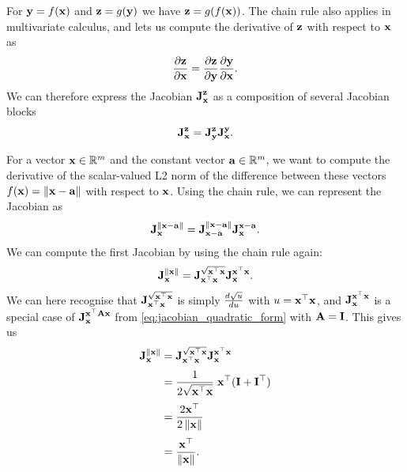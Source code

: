 For $\vecy = f(\vecx)$ and $\vecz = g(\vecy)$ we have $\vecz = g(f(\vecx))$.
The chain rule also applies in multivariate calculus, and lets us compute the derivative of $\vecz$ with respect to $\vecx$ as
\begin{equation}
  \dpar{\vecz}{\vecx} = \dpar{\vecz}{\vecy} \dpar{\vecy}{\vecx}.
\end{equation}
We can therefore express the Jacobian $\jac{\vecz}{\vecx}$ as a composition of several Jacobian blocks
\begin{equation}
  \jac{\vecz}{\vecx} = \jac{\vecz}{\vecy} \jac{\vecy}{\vecx}.
\end{equation}

\begin{example}[frametitle=Computing the Jacobian $\jac{\norm{\vecx - \veca}}{\vecx}$] \label{ex:jacobian-of-norm}
For a vector $\vecx \in \bbR^m$ and the constant vector $\veca \in \bbR^m$, we want to compute the derivative of the scalar-valued L2 norm of the difference between these vectors $f(\vecx) = \norm{\vecx - \veca}$ with respect to $\vecx$.
Using the chain rule, we can represent the Jacobian as
\begin{equation} \label{eq:jacobian_normdiff_blocks}
  \jac{\norm{\vecx - \veca}}{\vecx} = \jac{\norm{\vecx - \veca}}{\vecx - \veca} \jac{\vecx - \veca}{\vecx}.
\end{equation}
We can compute the first Jacobian by using the chain rule again:
\begin{equation}
  \jac{\norm{\vecx}}{\vecx} = \jac{\sqrt{\vecx\trans \vecx}}{\vecx\trans \vecx} \jac{\vecx\trans \vecx}{\vecx}.
\end{equation}
We can here recognise that $\jac{\sqrt{\vecx\trans \vecx}}{\vecx\trans \vecx}$ is simply $\dif{\sqrt{u}}{u}$ with $u = \vecx\trans \vecx$, and $\jac{\vecx\trans \vecx}{\vecx}$ is a special case of $\jac{\vecx\trans \matA \vecx}{\vecx}$ from \eqref{eq:jacobian_quadratic_form} with $\matA = \matI$.
This gives us
\begin{subequations} \label{eq:jacobian_norm}
\begin{align}
  \jac{\norm{\vecx}}{\vecx} 
  &= \jac{\sqrt{\vecx\trans \vecx}}{\vecx\trans \vecx} \jac{\vecx\trans \vecx}{\vecx}\\[0.3em]
  &= \frac{1}{2 \sqrt{\vecx\trans \vecx}} \; \vecx\trans(\matI + \matI\trans)\\[0.3em]
  &= \frac{2 \vecx\trans}{2 \norm{\vecx}}\\[0.3em]
  &= \frac{\vecx\trans}{\norm{\vecx}}.
\end{align}

\end{subequations}
\end{example}
